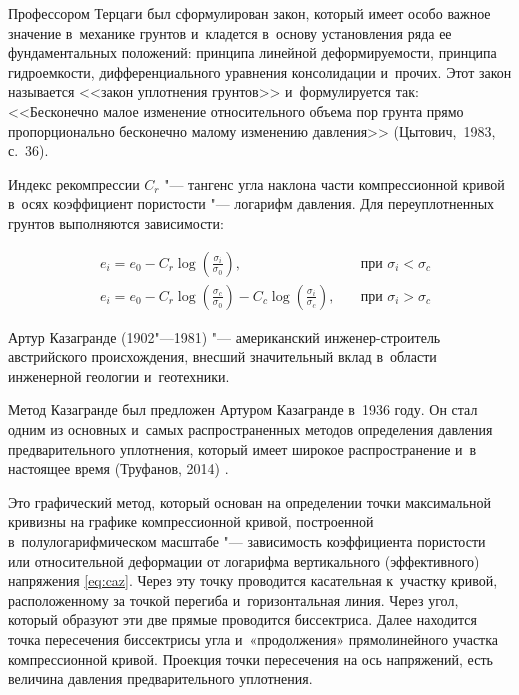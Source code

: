  Профессором Терцаги был сформулирован закон, который имеет особо важное значение в~механике грунтов и~кладется в~основу установления ряда ее фундаментальных положений: 
 принципа линейной деформируемости, 
 принципа гидроемкости, 
 дифференциального уравнения консолидации и~прочих.
 Этот закон называется <<закон уплотнения грунтов>> и~формулируется так: <<Бесконечно малое изменение относительного объема пор грунта прямо пропорционально бесконечно малому изменению давления>> (Цытович,~1983, с.~36)\cite[36]{cytovich1983}.

 Индекс рекомпрессии $C_r$ "--- тангенс угла наклона части компрессионной кривой в~осях коэффициент пористости "--- логарифм давления.
 Для переуплотненных грунтов выполняются зависимости:%

\begin{subequations}
  \label{eq:over}
  \begin{align}
    \label{eq:cr}
    & e_i = e_0 - C_r\log \left(\frac{\sigma_i}{\sigma_0}\right), \quad &\text{при } \sigma_i<\sigma_c \\
    \label{eq:crcc}
    & e_i = e_0 - C_r\log \left(\frac{\sigma_c}{\sigma_0}\right) - C_c\log \left(\frac{\sigma_i}{\sigma_c}\right), \quad &\text{при } \sigma_i>\sigma_c
  \end{align}
\end{subequations}



 
 Артур Казагранде (1902"---1981) "--- американский инженер-строитель австрийского происхождения, внесший значительный вклад в~области инженерной геологии и~геотехники. 
 
 Метод Казагранде был предложен Артуром Казагранде в~1936 году.
 Он стал одним из основных и~самых распространенных методов определения давления предварительного уплотнения, который имеет широкое распространение и~в настоящее время (Труфанов, 2014) \cite{truf2014}.
 
    

 Это графический метод, который основан на определении точки максимальной кривизны на графике компрессионной кривой, построенной в~полулогарифмическом масштабе "--- зависимость коэффициента пористости или относительной деформации от логарифма вертикального (эффективного) напряжения \ref{eq:caz}. 
 Через эту точку проводится касательная к~участку кривой, расположенному за точкой перегиба и~горизонтальная линия. 
 Через угол, который образуют эти две прямые проводится биссектриса. 
 Далее находится точка пересечения биссектрисы угла и~«продолжения» прямолинейного участка компрессионной кривой. Проекция точки пересечения на ось напряжений, есть величина давления предварительного уплотнения. 

